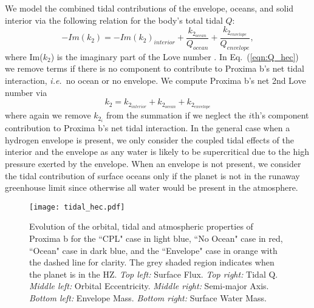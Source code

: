 \documentclass[preprint,12pt]{aastex}
\newcommand{\xxx}[1]{{\color{red} #1}} %
\def\ie{{\it i.e.\ }}
\begin{document}
We model the combined tidal contributions of the envelope, oceans, and
solid interior via the following relation for the body's total tidal
$Q$:
\begin{equation}
\label{eqn:Q_hec}
-Im(k_2) = -Im(k_2)_{interior} + \frac{ k_{2_{ocean}}}{Q_{ocean}} +  %
\frac{ k_{2_{envelope}}}{Q_{envelope}},
\end{equation}
where Im($k_2$) is the imaginary part of the Love number \citep[see][]{DriscollBarnes15}. In Eq.~(\ref{eqn:Q_hec}) we remove terms if there is no 
component to contribute to Proxima b's net tidal interaction, \ie no ocean or no envelope.  
\xxx{
We
compute Proxima b's net 2nd Love number via
\begin{equation}
\label{eqn:k2_hec}
k_2 = k_{2_{interior}} + k_{2_{ocean}} + k_{2_{envelope}}
\end{equation}
where again we remove $k_{2_{i}}$ from the summation if we neglect the
$i$th's component contribution to Proxima b's net tidal interaction.
}
In the general case when a hydrogen envelope is present, we only
consider the coupled tidal effects of the interior and the envelope as any
water is likely to be supercritical due to the high pressure exerted
by the envelope.  When an envelope is not present,
we consider the tidal contribution of surface oceans only if the planet is
not in the runaway greenhouse limit since otherwise all water would be present
in the atmosphere.

\begin{figure} 
\centering
\texttt{[image: tidal\_hec.pdf]}
\caption{Evolution of the orbital, tidal and atmospheric properties of
  Proxima b for the ``CPL" case in light blue, ``No Ocean" case in
  red, ``Ocean" case in dark blue, and the ``Envelope" case in orange
  with the dashed line for clarity.  The grey shaded region indicates
  when the planet is in the HZ. {\it Top left:} Surface Flux. {\it Top
    right:} Tidal Q. {\it Middle left:} Orbital Eccentricity. {\it
    Middle right:} Semi-major Axis. {\it Bottom left:} Envelope
  Mass. {\it Bottom right:} Surface Water Mass.}
\label{fig:tidal_hec}
\end{figure}
\end{document}
